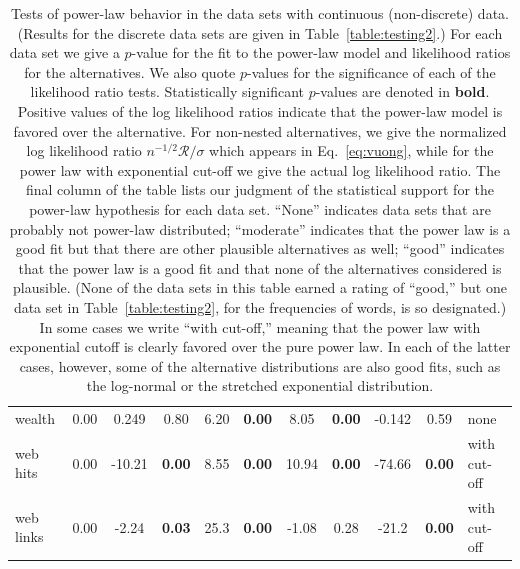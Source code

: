 \documentclass[final]{siamltex}
\newcommand{\tbf}{\textbf}
\begin{document}
\begin{table}
\begin{center}
\begin{tabular}{l|c|cc|cc|cc|cc|l}
wealth     &      0.00  & 0.249  &      0.80  & 6.20 & \tbf{0.00} & 8.05   & \tbf{0.00} & -0.142 &      0.59  & none \\
web hits   &      0.00  & -10.21 & \tbf{0.00} & 8.55 & \tbf{0.00} & 10.94  & \tbf{0.00} & -74.66 & \tbf{0.00} & with cut-off \\
web links  &      0.00  & -2.24  & \tbf{0.03} & 25.3 & \tbf{0.00} & -1.08  &      0.28  & -21.2  & \tbf{0.00} & with cut-off
\end{tabular}
\end{center}
\caption{Tests of power-law behavior in the data sets with continuous
 (non-discrete) data.  (Results for the discrete data sets are given in
 Table~\ref{table:testing2}.)  For each data set we give a $p$-value for
 the fit to the power-law model and likelihood ratios for the
 alternatives.  We also quote $p$-values for the significance of each of
 the likelihood ratio tests.  Statistically significant $p$-values are
 denoted in \textbf{bold}.  Positive values of the log likelihood ratios
 indicate that the power-law model is favored over the alternative.  For
 non-nested alternatives, we give the normalized log likelihood ratio
 $n^{-1/2}\mathcal{R}/\sigma$ which appears in Eq.~\eqref{eq:vuong}, while
 for the power law with exponential cut-off we give the actual log
 likelihood ratio.  The final column of the table lists our judgment of
 the statistical support for the power-law hypothesis for each data set.
 ``None'' indicates data sets that are probably not power-law distributed;
 ``moderate'' indicates that the power law is a good fit but that there
 are other plausible alternatives as well; ``good'' indicates that the
 power law is a good fit and that none of the alternatives considered is
 plausible.  (None of the data sets in this table earned a rating of
 ``good,'' but one data set in Table~\ref{table:testing2}, for the
 frequencies of words, is so designated.)  In some cases we write ``with
 cut-off,'' meaning that the power law with exponential cutoff is clearly
 favored over the pure power law.  In each of the latter cases, however,
 some of the alternative distributions are also good fits, such as the
 log-normal or the stretched exponential distribution.}
\label{table:testing1}
\end{table}
\end{document}
